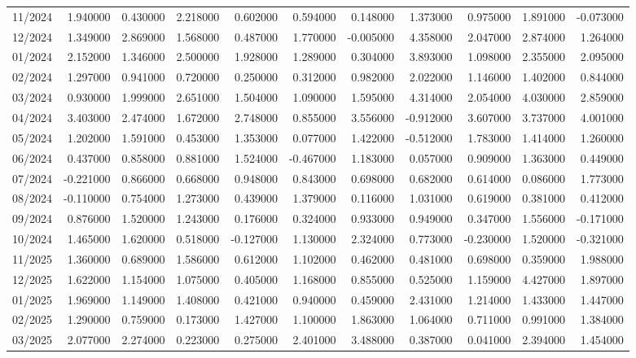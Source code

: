 \begin{tabular}{lrrrrrrrrrr}
11/2024 & 1.940000 & 0.430000 & 2.218000 & 0.602000 & 0.594000 & 0.148000 & 1.373000 & 0.975000 & 1.891000 & -0.073000 \\
12/2024 & 1.349000 & 2.869000 & 1.568000 & 0.487000 & 1.770000 & -0.005000 & 4.358000 & 2.047000 & 2.874000 & 1.264000 \\
01/2024 & 2.152000 & 1.346000 & 2.500000 & 1.928000 & 1.289000 & 0.304000 & 3.893000 & 1.098000 & 2.355000 & 2.095000 \\
02/2024 & 1.297000 & 0.941000 & 0.720000 & 0.250000 & 0.312000 & 0.982000 & 2.022000 & 1.146000 & 1.402000 & 0.844000 \\
03/2024 & 0.930000 & 1.999000 & 2.651000 & 1.504000 & 1.090000 & 1.595000 & 4.314000 & 2.054000 & 4.030000 & 2.859000 \\
04/2024 & 3.403000 & 2.474000 & 1.672000 & 2.748000 & 0.855000 & 3.556000 & -0.912000 & 3.607000 & 3.737000 & 4.001000 \\
05/2024 & 1.202000 & 1.591000 & 0.453000 & 1.353000 & 0.077000 & 1.422000 & -0.512000 & 1.783000 & 1.414000 & 1.260000 \\
06/2024 & 0.437000 & 0.858000 & 0.881000 & 1.524000 & -0.467000 & 1.183000 & 0.057000 & 0.909000 & 1.363000 & 0.449000 \\
07/2024 & -0.221000 & 0.866000 & 0.668000 & 0.948000 & 0.843000 & 0.698000 & 0.682000 & 0.614000 & 0.086000 & 1.773000 \\
08/2024 & -0.110000 & 0.754000 & 1.273000 & 0.439000 & 1.379000 & 0.116000 & 1.031000 & 0.619000 & 0.381000 & 0.412000 \\
09/2024 & 0.876000 & 1.520000 & 1.243000 & 0.176000 & 0.324000 & 0.933000 & 0.949000 & 0.347000 & 1.556000 & -0.171000 \\
10/2024 & 1.465000 & 1.620000 & 0.518000 & -0.127000 & 1.130000 & 2.324000 & 0.773000 & -0.230000 & 1.520000 & -0.321000 \\
11/2025 & 1.360000 & 0.689000 & 1.586000 & 0.612000 & 1.102000 & 0.462000 & 0.481000 & 0.698000 & 0.359000 & 1.988000 \\
12/2025 & 1.622000 & 1.154000 & 1.075000 & 0.405000 & 1.168000 & 0.855000 & 0.525000 & 1.159000 & 4.427000 & 1.897000 \\
01/2025 & 1.969000 & 1.149000 & 1.408000 & 0.421000 & 0.940000 & 0.459000 & 2.431000 & 1.214000 & 1.433000 & 1.447000 \\
02/2025 & 1.290000 & 0.759000 & 0.173000 & 1.427000 & 1.100000 & 1.863000 & 1.064000 & 0.711000 & 0.991000 & 1.384000 \\
03/2025 & 2.077000 & 2.274000 & 0.223000 & 0.275000 & 2.401000 & 3.488000 & 0.387000 & 0.041000 & 2.394000 & 1.454000 \\

\end{tabular}
